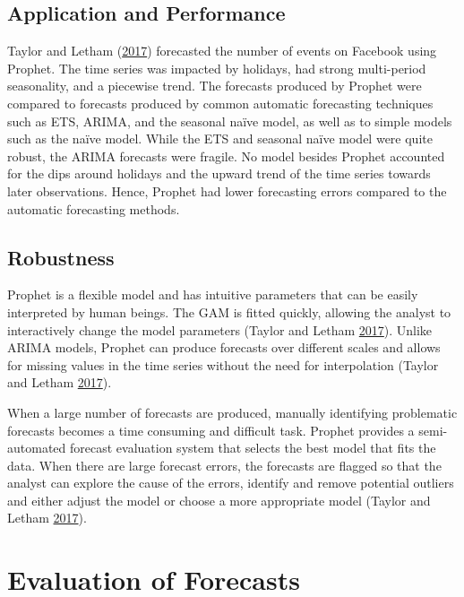 \documentclass[12pt,preprint, authoryear]{elsarticle}
\numberwithin{equation}{section}
\numberwithin{figure}{section}
\numberwithin{table}{section}
\begin{document}
\subsection{Application and
Performance}\label{application-and-performance-1}

Taylor and Letham (\protect\hyperlink{ref-taylor2017forecasting}{2017})
forecasted the number of events on Facebook using Prophet. The time
series was impacted by holidays, had strong multi-period seasonality,
and a piecewise trend. The forecasts produced by Prophet were compared
to forecasts produced by common automatic forecasting techniques such as
ETS, ARIMA, and the seasonal naïve model, as well as to simple models
such as the naïve model. While the ETS and seasonal naïve model were
quite robust, the ARIMA forecasts were fragile. No model besides Prophet
accounted for the dips around holidays and the upward trend of the time
series towards later observations. Hence, Prophet had lower forecasting
errors compared to the automatic forecasting methods.

\subsection{Robustness}\label{robustness-1}

Prophet is a flexible model and has intuitive parameters that can be
easily interpreted by human beings. The GAM is fitted quickly, allowing
the analyst to interactively change the model parameters (Taylor and
Letham \protect\hyperlink{ref-taylor2017forecasting}{2017}). Unlike
ARIMA models, Prophet can produce forecasts over different scales and
allows for missing values in the time series without the need for
interpolation (Taylor and Letham
\protect\hyperlink{ref-taylor2017forecasting}{2017}).

When a large number of forecasts are produced, manually identifying
problematic forecasts becomes a time consuming and difficult task.
Prophet provides a semi-automated forecast evaluation system that
selects the best model that fits the data. When there are large forecast
errors, the forecasts are flagged so that the analyst can explore the
cause of the errors, identify and remove potential outliers and either
adjust the model or choose a more appropriate model (Taylor and Letham
\protect\hyperlink{ref-taylor2017forecasting}{2017}).

\section{Evaluation of Forecasts}\label{evaluation-of-forecasts}
\end{document}
